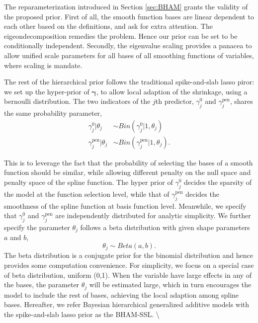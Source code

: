 \documentclass[AMA,STIX1COL,]{WileyNJD-v2}
\begin{document}
The reparameterization introduced in Section \ref{sec:BHAM} grants the
validity of the proposed prior. First of all, the smooth function bases
are linear dependent to each other based on the definitions, and ask for
extra attention. The eigeondecomposition remedies the problem. Hence our
prior can be set to be conditionally independent. Secondly, the
eigenvalue scaling provides a panacea to allow unified scale parameters
for all bases of all smoothing functions of variables, where scaling is
mandate.

The rest of the hierarchical prior follows the traditional
spike-and-slab lasso piror: we set up the hyper-prior of
\(\boldsymbol{\gamma}\), to allow local adaption of the shrinkage, using
a bernoulli distribution. The two indicators of the \(j\)th predictor,
\(\gamma^{0}_j\) and \(\gamma^\text{pen}_j\), shares the same
probability parameter, \[
\begin{aligned}
\gamma_{j}^{0} | \theta_j &\sim Bin(\gamma^{0}_{j}|1, \theta_j)\\
\gamma_{j}^\text{pen}| \theta_j &\sim Bin(\gamma^\text{pen}_{j}|1, \theta_j).
\end{aligned}
\]

This is to leverage the fact that the probability of selecting the bases
of a smooth function should be similar, while allowing different penalty
on the null space and penalty space of the spline function. The hyper
prior of \(\gamma_{j}^{0}\) decides the sparsity of the model at the
function selection level, while that of \(\gamma_{j}^\text{pen}\)
decides the smoothness of the spline function at basis function level.
Meanwhile, we specify that \(\gamma_{j}^0\) and
\(\gamma_{j}^\text{pen}\) are independently distributed for analytic
simplicity. We further specify the parameter \(\theta_j\) follows a beta
distribution with given shape parameters \(a\) and \(b\), \[
\theta_j \sim Beta(a, b).
\] The beta distribution is a conjugate prior for the binomial
distribution and hence provides some computation convenience. For
simplicity, we focus on a special case of beta distribution, uniform
(0,1). When the variable have large effects in any of the bases, the
parameter \(\theta_j\) will be estimated large, which in turn encourages
the model to include the rest of bases, achieving the local adaption
among spline bases. Hereafter, we refer Bayesian hierarchical
generalized additive models with the spike-and-slab lasso prior as the
BHAM-SSL. \textbackslash{}
\end{document}
